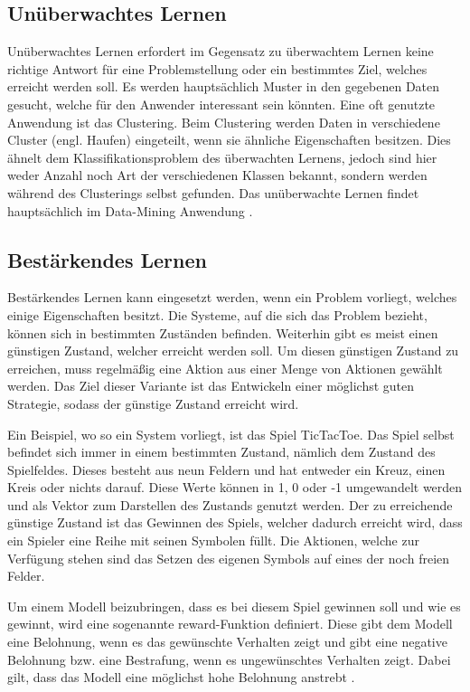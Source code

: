 \subsection{Unüberwachtes Lernen}
\label{subsec:unueberwachtesLernen}
Unüberwachtes Lernen erfordert im Gegensatz zu überwachtem Lernen keine richtige Antwort für eine Problemstellung oder ein bestimmtes Ziel, welches erreicht werden soll. Es werden hauptsächlich Muster in den gegebenen Daten gesucht, welche für den Anwender interessant sein könnten. Eine oft genutzte Anwendung ist das Clustering. Beim Clustering werden Daten in verschiedene Cluster (engl. Haufen) eingeteilt, wenn sie ähnliche Eigenschaften besitzen. Dies ähnelt dem Klassifikationsproblem des überwachten Lernens, jedoch sind hier weder Anzahl noch Art der verschiedenen Klassen bekannt, sondern werden während des Clusterings selbst gefunden. Das unüberwachte Lernen findet hauptsächlich im Data-Mining Anwendung \cite[vgl.][]{ueberwachtMaschLernen}.

\subsection{Bestärkendes Lernen}
\label{subsec:bestaerkendesLernen}
Bestärkendes Lernen kann eingesetzt werden, wenn ein Problem vorliegt, welches einige Eigenschaften besitzt. Die Systeme, auf die sich das Problem bezieht, können sich in bestimmten Zuständen befinden. Weiterhin gibt es meist einen günstigen Zustand, welcher erreicht werden soll. Um diesen günstigen Zustand zu erreichen, muss regelmäßig eine Aktion aus einer Menge von Aktionen gewählt werden. Das Ziel dieser Variante ist das Entwickeln einer möglichst guten Strategie, sodass der günstige Zustand erreicht wird.

Ein Beispiel, wo so ein System vorliegt, ist das Spiel TicTacToe. Das Spiel selbst befindet sich immer in einem bestimmten Zustand, nämlich dem Zustand des Spielfeldes. Dieses besteht aus neun Feldern und hat entweder ein Kreuz, einen Kreis oder nichts darauf. Diese Werte können in 1, 0 oder -1 umgewandelt werden und als Vektor zum Darstellen des Zustands genutzt werden. Der zu erreichende günstige Zustand ist das Gewinnen des Spiels, welcher dadurch erreicht wird, dass ein Spieler eine Reihe mit seinen Symbolen füllt. Die Aktionen, welche zur Verfügung stehen sind das Setzen des eigenen Symbols auf eines der noch freien Felder.

Um einem Modell beizubringen, dass es bei diesem Spiel gewinnen soll und wie es gewinnt, wird eine sogenannte reward-Funktion definiert. Diese gibt dem Modell eine Belohnung, wenn es das gewünschte Verhalten zeigt und gibt eine negative Belohnung bzw. eine Bestrafung, wenn es ungewünschtes Verhalten zeigt. Dabei gilt, dass das Modell eine möglichst hohe Belohnung anstrebt \cite[vgl.][S. 255ff.]{StatMaschLernen}.

